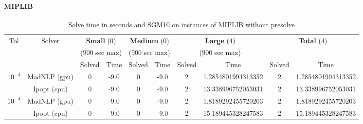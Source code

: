 \documentclass{article}
\begin{document}
\paragraph{MIPLIB}
\begin{table}[t]
  \centering\footnotesize
  \caption{Solve time in seconds and SGM10 on instances of MIPLIB without presolve}
  \begin{tabular}{|c|c|cc|cc|cc|cc|}
  \hline
  \multirow{ 3}{*}{Tol} & \multirow{ 3}{*}{Solver} & \multicolumn{2}{c|}{\textbf{Small} (0)}& \multicolumn{2}{c|}{\textbf{Medium} (0)}& \multicolumn{2}{c|}{\textbf{Large} (4)}& \multicolumn{2}{c|}{\multirow{2}{*}{\textbf{Total} (4)}}\\
                        && \multicolumn{2}{c|}{(900 sec max)}& \multicolumn{2}{c|}{(900 sec max)}& \multicolumn{2}{c|}{(900 sec max)}&&\\
                        &&  Solved & Time &  Solved & Time &  Solved & Time &  Solved & Time \\
  \hline
    \multirow{2}{*}{$10^{-4}$} & MadNLP (gpu) & 0 & -9.0 & 0 & -9.0 & 2 & 1.2854801994313352 & 2 & 1.2854801994313352  \\
                        & Ipopt (cpu) & 0 & -9.0 & 0 & -9.0 & 2 & 13.338996752053031 & 2 & 13.338996752053031  \\

  \hline
    \multirow{2}{*}{$10^{-4}$} & MadNLP (gpu) & 0 & -9.0 & 0 & -9.0 & 2 & 1.8189292455720203 & 2 & 1.8189292455720203  \\
                        & Ipopt (cpu) & 0 & -9.0 & 0 & -9.0 & 2 & 15.189445328247583 & 2 & 15.189445328247583  \\


\end{tabular}
\end{table}
\end{document}
